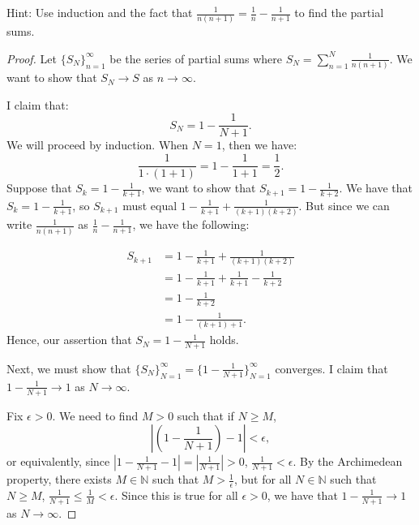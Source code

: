 \documentclass[12pt]{amsart}
\begin{document}
\begin{enumerate}
\medskip

\noindent Hint:  Use induction and the fact that $\frac{1}{n(n+1)}=\frac{1}{n}-\frac{1}{n+1}$ 
to find the partial sums.

\begin{proof}
Let $\{S_N\}_{n=1}^\infty$ be the series of partial sums where $S_N = \sum_{n=1}^N  \frac{1}{n(n+1)}$. We want to show that $S_N \to S$ as $n\to\infty$.

I claim that:
\[ S_N = 1 - \frac 1 {N+1}. \]
We will proceed by induction. When $N=1$, then we have:
\[ \frac 1 {1\cdot(1+1)} = 1- \frac 1 {1+1} = \frac 1 2. \]
Suppose that $S_k = 1 - \frac 1 {k+1}$, we want to show that $S_{k+1} = 1 - \frac 1 {k+2}$. We have that $S_k = 1 - \frac 1 {k+1}$, so $S_{k+1}$ must equal $1 - \frac 1 {k+1} + \frac 1 {(k+1)(k+2)}$. But since we can write $\frac{1}{n(n+1)}$ as $\frac{1}{n}-\frac{1}{n+1}$, we have the following:

\begin{align*}
S_{k+1} &= 1 - \frac 1 {k+1} + \frac 1 {(k+1)(k+2)} \\
&= 1 - \frac 1 {k+1} + \frac{1}{k+1}-\frac{1}{k+2} \\
&= 1- \frac{1}{k+2} \\
&= 1 - \frac 1 {(k+1) + 1}.
\end{align*}
Hence, our assertion that $S_N = 1 - \frac 1 {N+1}$ holds.

Next, we must show that $\{ S_N \}_{N=1}^\infty = \{ 1 - \frac 1 {N+1} \}_{N=1}^\infty$ converges. I claim that $1 - \frac 1 {N+1} \to 1$ as $N \to \infty$.

Fix $\epsilon > 0$. We need to find $M>0$ such that if $N\ge M$,
\[ \left| \left(1 - \frac 1 {N+1}\right) - 1 \right| < \epsilon,\]
or equivalently, since $|1- \frac 1 {N+1} -1 | = | \frac 1 {N+1} | > 0$, $\frac 1 {N+1} < \epsilon$.
By the Archimedean property, there exists $M\in\mathbb N$ such that $M > \frac 1 \epsilon$, but for all $N\in\mathbb N$ such that $N\ge M$, $\frac 1 {N+1} \le \frac 1 M < \epsilon$.
Since this is true for all $\epsilon > 0$, we have that $1 - \frac 1 {N+1} \to 1$ as $N \to \infty$.
\end{proof}


\end{enumerate}
\end{document}
